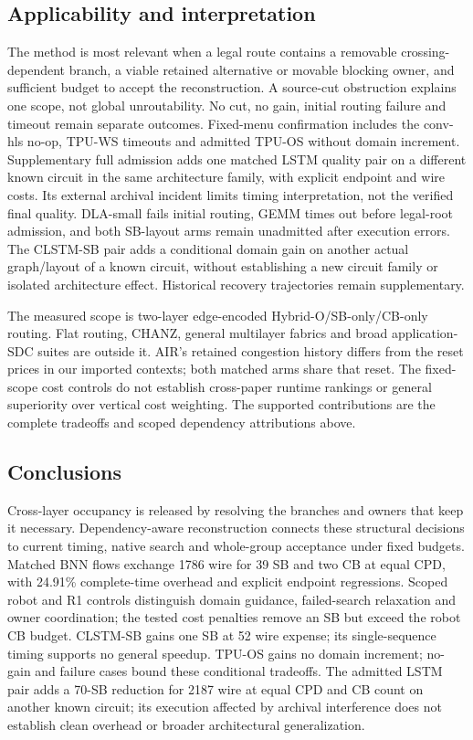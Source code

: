\documentclass[conference,10pt]{IEEEtran}
\begin{document}
\subsection{Applicability and interpretation}
The method is most relevant when a legal route contains a removable crossing-dependent branch, a viable retained alternative or movable blocking owner, and sufficient budget to accept the reconstruction. A source-cut obstruction explains one scope, not global unroutability. No cut, no gain, initial routing failure and timeout remain separate outcomes. Fixed-menu confirmation includes the conv-hls no-op, TPU-WS timeouts and admitted TPU-OS without domain increment. Supplementary full admission adds one matched LSTM quality pair on a different known circuit in the same architecture family, with explicit endpoint and wire costs. Its external archival incident limits timing interpretation, not the verified final quality. DLA-small fails initial routing, GEMM times out before legal-root admission, and both SB-layout arms remain unadmitted after execution errors. The CLSTM-SB pair adds a conditional domain gain on another actual graph/layout of a known circuit, without establishing a new circuit family or isolated architecture effect. Historical recovery trajectories remain supplementary.

The measured scope is two-layer edge-encoded Hybrid-O/SB-only/CB-only routing. Flat routing, CHANZ, general multilayer fabrics and broad application-SDC suites are outside it. AIR's retained congestion history differs from the reset prices in our imported contexts; both matched arms share that reset. The fixed-scope cost controls do not establish cross-paper runtime rankings or general superiority over vertical cost weighting. The supported contributions are the complete tradeoffs and scoped dependency attributions above.

\subsection{Conclusions}
Cross-layer occupancy is released by resolving the branches and owners that keep it necessary. Dependency-aware reconstruction connects these structural decisions to current timing, native search and whole-group acceptance under fixed budgets. Matched BNN flows exchange 1786 wire for 39 SB and two CB at equal CPD, with 24.91\% complete-time overhead and explicit endpoint regressions. Scoped robot and R1 controls distinguish domain guidance, failed-search relaxation and owner coordination; the tested cost penalties remove an SB but exceed the robot CB budget. CLSTM-SB gains one SB at 52 wire expense; its single-sequence timing supports no general speedup. TPU-OS gains no domain increment; no-gain and failure cases bound these conditional tradeoffs. The admitted LSTM pair adds a 70-SB reduction for 2187 wire at equal CPD and CB count on another known circuit; its execution affected by archival interference does not establish clean overhead or broader architectural generalization.


\end{document}
